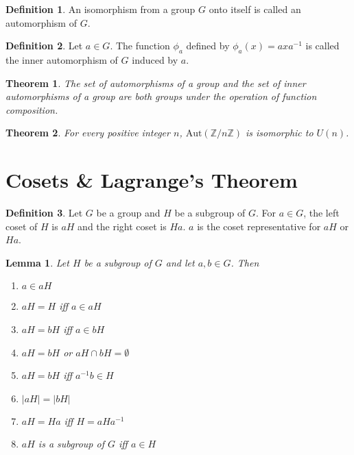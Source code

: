 \documentclass{article}
\newcommand{\Z}{\mathbb{Z}}
\newtheorem{theorem}{Theorem}[section]
\newtheorem*{lemma}{Lemma}
\theoremstyle{definition}
\newtheorem*{definition}{Definition}
\begin{document}
\begin{definition}
    An isomorphism from a group $G$ onto itself is called an automorphism of $G$.
\end{definition}

\begin{definition}
    Let $a \in G$. The function $\phi_a$ defined by $\phi_a(x) = axa^{-1}$ is called the inner automorphism of $G$ induced by $a$.
\end{definition}

\begin{theorem}
    The set of automorphisms of a group and the set of inner automorphisms of a group are both groups under the operation of function composition.
\end{theorem}

\begin{theorem}
    For every positive integer $n$, $\text{Aut}(\Z/n\Z)$ is isomorphic to $U(n)$.
\end{theorem}

\section{Cosets \& Lagrange's Theorem}

\begin{definition}
    Let $G$ be a group and $H$ be a subgroup of $G$. For $a \in G$, the left coset of $H$ is $aH$ and the right coset is $Ha$. $a$ is the coset representative for $aH$ or $Ha$.
\end{definition}

\begin{lemma}
    Let $H$ be a subgroup of $G$ and let $a, b \in G$. Then 
    \begin{enumerate}
        \item $a \in aH$
        \item $aH = H$ iff $a \in aH$
        \item $aH = bH$ iff $a \in bH$
        \item $aH = bH$ or $aH \cap bH = \emptyset$
        \item $aH = bH$ iff $a^{-1}b \in H$
        \item $|aH| = |bH|$
        \item $aH = Ha$ iff $H = aHa^{-1}$
        \item $aH$ is a subgroup of $G$ iff $a \in H$
    \end{enumerate}
\end{lemma}
\end{document}
